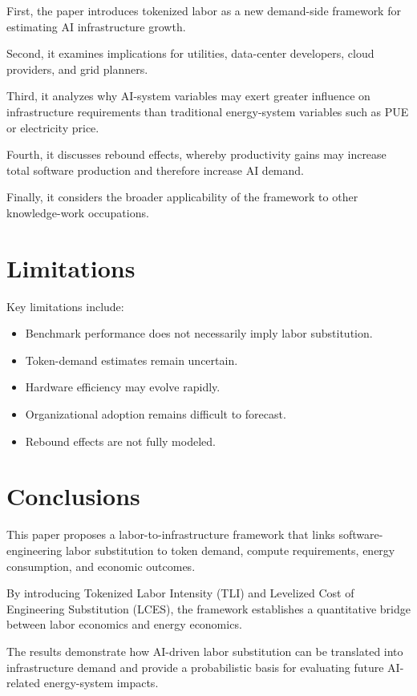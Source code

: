 First, the paper introduces tokenized labor as a new demand-side framework for estimating AI infrastructure growth.

Second, it examines implications for utilities, data-center developers, cloud providers, and grid planners.

Third, it analyzes why AI-system variables may exert greater influence on infrastructure requirements than traditional energy-system variables such as PUE or electricity price.

Fourth, it discusses rebound effects, whereby productivity gains may increase total software production and therefore increase AI demand.

Finally, it considers the broader applicability of the framework to other knowledge-work occupations.

\section{Limitations}

Key limitations include:

\begin{itemize}
\item Benchmark performance does not necessarily imply labor substitution.
\item Token-demand estimates remain uncertain.
\item Hardware efficiency may evolve rapidly.
\item Organizational adoption remains difficult to forecast.
\item Rebound effects are not fully modeled.
\end{itemize}

\section{Conclusions}

This paper proposes a labor-to-infrastructure framework that links software-engineering labor substitution to token demand, compute requirements, energy consumption, and economic outcomes.

By introducing Tokenized Labor Intensity (TLI) and Levelized Cost of Engineering Substitution (LCES), the framework establishes a quantitative bridge between labor economics and energy economics.

The results demonstrate how AI-driven labor substitution can be translated into infrastructure demand and provide a probabilistic basis for evaluating future AI-related energy-system impacts.


